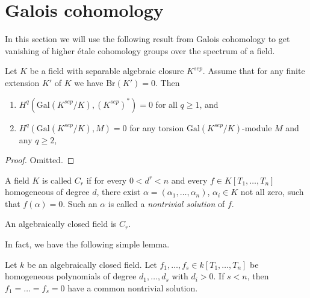 \section{Galois cohomology}
\label{section-galois-cohomology}

\noindent
In this section we will use the following result from Galois cohomology
to get vanishing of higher \'etale cohomology groups over the spectrum
of a field.

\begin{proposition}
\label{proposition-serre-galois}
\begin{reference}
\cite[Chapter II, Section 3, Proposition 5]{SerreGaloisCohomology}
\end{reference}
Let $K$ be a field with separable algebraic closure $K^{sep}$.
Assume that for any finite extension $K'$ of $K$ we have
$\text{Br}(K') = 0$. Then
\begin{enumerate}
\item $H^q(\text{Gal}(K^{sep}/K), (K^{sep})^*) = 0$
for all $q \geq 1$, and
\item $H^q(\text{Gal}(K^{sep}/K), M) = 0$
for any torsion $\text{Gal}(K^{sep}/K)$-module $M$ and any $q \geq 2$,
\end{enumerate}
\end{proposition}

\begin{proof}
Omitted.
\end{proof}


\begin{definition}
\label{definition-Cr}
A field $K$ is called {\it $C_r$}
if for every $0 < d^r < n$ and every $f \in K[T_1,
\ldots, T_n]$ homogeneous of degree $d$, there exist $\alpha = (\alpha_1,
\ldots, \alpha_n)$, $\alpha_i \in K$ not all zero, such that $f(\alpha) = 0$.
Such an $\alpha$ is called a {\it nontrivial solution} of $f$.
\end{definition}

\begin{example}
\label{example-algebraically-closed-field-Cr}
An algebraically closed field is $C_r$.
\end{example}

\noindent
In fact, we have the following simple lemma.

\begin{lemma}
\label{lemma-algebraically-closed-find-solutions}
Let $k$ be an algebraically closed field. Let
$f_1, \ldots, f_s \in k[T_1, \ldots, T_n]$
be homogeneous polynomials of degree $d_1, \ldots, d_s$ with $d_i
> 0$. If $s < n$, then $f_1 = \ldots = f_s = 0$ have a common nontrivial
solution.
\end{lemma}


